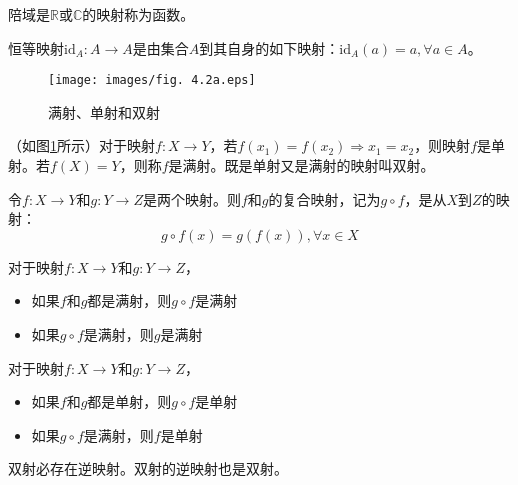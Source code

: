 \documentclass[main.tex]{subfiles}
\begin{document}
\begin{definition}[函数]
陪域是$\mathbb{R}$或$\mathbb{C}$的映射称为函数。
\end{definition}

\begin{definition}[恒等映射]
恒等映射$\mathrm{id}_A:A\rightarrow A$是由集合$A$到其自身的如下映射：$\mathrm{id}_A\left(a\right)=a,\forall a\in A$。
\end{definition}

\begin{figure}[htbp]
\centering
\texttt{[image: images/fig. 4.2a.eps]}
\caption{满射、单射和双射}
\label{fig:sur_in_bijective}
\end{figure}

\begin{definition}[单射、双射、满射]
（如图\ref{fig:sur_in_bijective}所示）对于映射$f:X\rightarrow Y$，若$f\left(x_1\right)=f\left(x_2\right)\Rightarrow x_1=x_2$，则映射$f$是单射。若$f\left(X\right)=Y$，则称$f$是满射。既是单射又是满射的映射叫双射。
\end{definition}

\begin{definition}
令$f:X\rightarrow Y$和$g:Y\rightarrow Z$是两个映射。则$f$和$g$的复合映射，记为$g\circ f$，是从$X$到$Z$的映射：
\[g\circ f\left(x\right)=g\left(f\left(x\right)\right),\forall x\in X\]
\end{definition}

\begin{theorem}
对于映射$f:X\rightarrow Y$和$g: Y\rightarrow Z$，
\begin{itemize}
    \item 如果$f$和$g$都是满射，则$g\circ f$是满射
    \item 如果$g\circ f$是满射，则$g$是满射
\end{itemize}
\end{theorem}

\begin{theorem}
对于映射$f:X\rightarrow Y$和$g: Y\rightarrow Z$，
\begin{itemize}
    \item 如果$f$和$g$都是单射，则$g\circ f$是单射
    \item 如果$g\circ f$是满射，则$f$是单射
\end{itemize}
\end{theorem}

\begin{theorem}
双射必存在逆映射。双射的逆映射也是双射。
\end{theorem}
\end{document}
